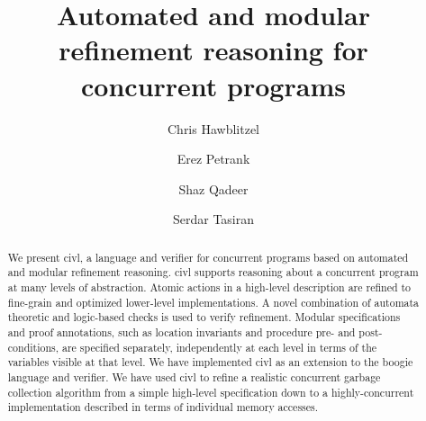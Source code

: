\documentclass{llncs}
\newcommand{\civl}{{\sc civl}\xspace}
\newcommand{\boogie}{{\sc boogie}\xspace}
\begin{document}
\title{Automated and modular refinement reasoning for concurrent programs}
\author{Chris Hawblitzel \and Erez Petrank \and Shaz Qadeer \and Serdar Tasiran}

\maketitle



\begin{abstract}
We present \civl, a language and verifier for concurrent programs based on automated and modular refinement reasoning.  
\civl supports reasoning about a concurrent program at many levels of abstraction. 
Atomic actions in a high-level description are refined to fine-grain and optimized lower-level implementations. 
A novel combination of automata theoretic and logic-based checks is used to verify refinement.   
Modular specifications and proof annotations, such as location invariants and procedure pre- and post-conditions, 
are specified separately, independently at each level in terms of the variables visible at that level. 
We have implemented \civl as an extension to the \boogie language and verifier.
We have used \civl to refine a realistic concurrent garbage collection algorithm
from a simple high-level specification down to a highly-concurrent implementation described in terms of individual memory accesses.
\end{abstract}











\end{document}
